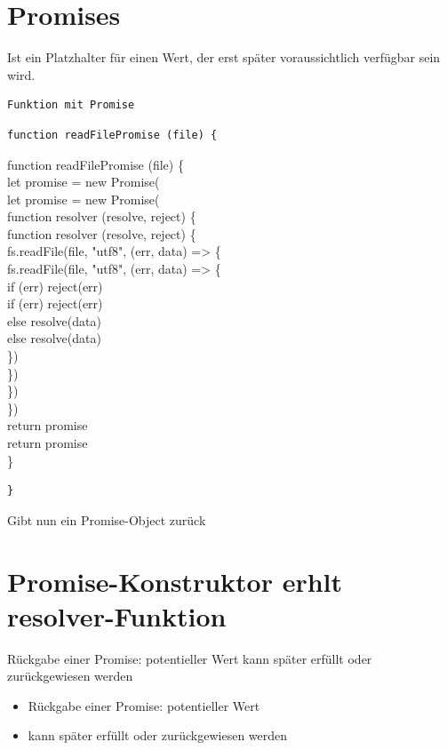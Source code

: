 \section*{Promises}
Ist ein Platzhalter für einen Wert, der erst später voraussichtlich verfügbar sein wird.

\begin{verbatim}
Funktion mit Promise
\end{verbatim}

\begin{verbatim}
function readFilePromise (file) {
\end{verbatim}

function readFilePromise (file) \{\\
let promise = new Promise(\\
let promise = new Promise(\\
function resolver (resolve, reject) \{\\
function resolver (resolve, reject) \{\\
fs.readFile(file, "utf8", (err, data) => \{\\
fs.readFile(file, "utf8", (err, data) => \{\\
if (err) reject(err)\\
if (err) reject(err)\\
else resolve(data)\\
else resolve(data)\\
\})\\
\})\\
\})\\
\})\\
return promise\\
return promise\\
\}

\begin{verbatim}
}
\end{verbatim}

Gibt nun ein Promise-Object zurück

\section*{Promise-Konstruktor erhlt resolver-Funktion}
Rückgabe einer Promise: potentieller Wert kann später erfüllt oder zurückgewiesen werden

\begin{itemize}
  \item Rückgabe einer Promise: potentieller Wert
  \item kann später erfüllt oder zurückgewiesen werden
\end{itemize}

